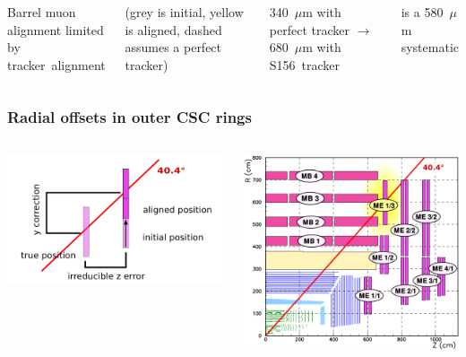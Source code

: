 \documentclass[compress]{beamer}
\begin{document}
\begin{frame}
\begin{columns}
Barrel muon alignment limited by \mbox{tracker alignment\hspace{-1 cm}}

\vspace{0.25 cm}
(grey is initial, yellow is aligned, dashed assumes a perfect tracker)

\vspace{0.25 cm}
340~$\mu$m with perfect tracker $\to$ 680~$\mu$m with \mbox{S156 tracker\hspace{-1 cm}}

is a 580~$\mu$m systematic
\end{columns}
\end{frame}

\begin{frame}
\frametitle{Radial offsets in outer CSC rings}
\begin{columns}
\includegraphics[width=\linewidth]{me13_motion.png}

\includegraphics[width=\linewidth]{muon_system_highlight.png}


\end{columns}
\end{frame}
\end{document}
